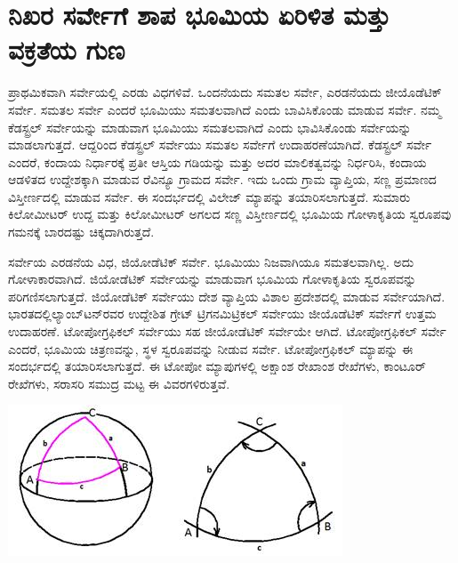 
\chapter{ನಿಖರ ಸರ್ವೇಗೆ ಶಾಪ ಭೂಮಿಯ ಏರಿಳಿತ ಮತ್ತು ವಕ್ರತೆಯ ಗುಣ}

ಪ್ರಾಥಮಿಕವಾಗಿ ಸರ್ವೇಯಲ್ಲಿ ಎರಡು ವಿಧಗಳಿವೆ. ಒಂದನೆಯದು ಸಮತಲ ಸರ್ವೇ, ಎರಡನೆಯದು ಜೀಯೊಡೆಟಿಕ್​ ಸರ್ವೇ. ಸಮತಲ ಸರ್ವೇ ಎಂದರೆ ಭೂಮಿಯು ಸಮತಲವಾಗಿದೆ ಎಂದು ಬಾವಿಸಿಕೊಂಡು ಮಾಡುವ ಸರ್ವೇ. ನಮ್ಮ ಕೆಡಸ್ಟ್ರಲ್​ ಸರ್ವೇಯನ್ನು ಮಾಡುವಾಗ ಭೂಮಿಯು ಸಮತಲವಾಗಿದೆ ಎಂದು ಭಾವಿಸಿಕೊಂಡು ಸರ್ವೇಯನ್ನು ಮಾಡಲಾಗುತ್ತದೆ. ಆದ್ದರಿಂದ ಕೆಡಸ್ಟ್ರಲ್​ ಸರ್ವೇಯು ಸಮತಲ ಸರ್ವೇಗೆ ಉದಾಹರಣೆಯಾಗಿದೆ. ಕೆಡಸ್ಟ್ರಲ್​ ಸರ್ವೇ ಎಂದರೆ, ಕಂದಾಯ ನಿರ್ಧಾರಕ್ಕೆ ಪ್ರತೀ ಆಸ್ತಿಯ ಗಡಿಯನ್ನು ಮತ್ತು ಅದರ ಮಾಲಿಕತ್ವವನ್ನು ನಿರ್ಧರಿಸಿ, ಕಂದಾಯ ಆಡಳಿತದ ಉದ್ದೇಶಕ್ಕಾಗಿ ಮಾಡುವ ರೆವಿನ್ಯೂ ಗ್ರಾಮದ ಸರ್ವೇ. ಇದು ಒಂದು ಗ್ರಾಮ ವ್ಯಾಪ್ತಿಯ, ಸಣ್ಣ ಪ್ರಮಾಣದ ವಿಸ್ತೀರ್ಣದಲ್ಲಿ ಮಾಡುವ ಸರ್ವೇ. ಈ ಸಂದರ್ಭದಲ್ಲಿ ವಿಲೇಜ್​ ಮ್ಯಾಪನ್ನು ತಯಾರಿಸಲಾಗುತ್ತದೆ. ಸುಮಾರು  ಕಿಲೋಮೀಟರ್​ ಉದ್ದ ಮತ್ತು  ಕಿಲೋಮೀಟರ್​ ಅಗಲದ ಸಣ್ಣ ವಿಸ್ತೀರ್ಣದಲ್ಲಿ ಭೂಮಿಯ ಗೋಳಾಕೃತಿಯ ಸ್ವರೂಪವು ಗಮನಕ್ಕೆ ಬಾರದಷ್ಟು ಚಿಕ್ಕದಾಗಿರುತ್ತದೆ.

ಸರ್ವೇಯ ಎರಡನೆಯ ವಿಧ, ಜಿಯೋಡೆಟಿಕ್​ ಸರ್ವೇ. ಭೂಮಿಯು ನಿಜವಾಗಿಯೂ ಸಮತಲವಾಗಿಲ್ಲ. ಅದು ಗೋಳಾಕಾರವಾಗಿದೆ. ಜಿಯೋಡೆಟಿಕ್​ ಸರ್ವೇಯನ್ನು ಮಾಡುವಾಗ ಭೂಮಿಯ ಗೋಳಾಕೃತಿಯ ಸ್ವರೂಪವನ್ನು ಪರಿಗಣಿಸಲಾಗುತ್ತದೆ. ಜಿಯೋಡೆಟಿಕ್​ ಸರ್ವೇಯು ದೇಶ ವ್ಯಾಪ್ತಿಯ ವಿಶಾಲ ಪ್ರದೇಶದಲ್ಲಿ ಮಾಡುವ ಸರ್ವೇಯಾಗಿದೆ. ಭಾರತದಲ್ಲಿ\break ಲ್ಯಾಂಬ್​ಟನ್​ರವರ ಉದ್ದೇಶಿತ ಗ್ರೇಟ್​ ಟ್ರಿಗನಮಿಟ್ರಿಕಲ್​ ಸರ್ವೇಯು ಜೀಯೊಡೆಟಿಕ್​ ಸರ್ವೇಗೆ ಉತ್ತಮ ಉದಾಹರಣೆ. ಟೋಪೋಗ್ರಫಿಕಲ್​ ಸರ್ವೇಯು ಸಹ ಜೀಯೋಡೆಟಿಕ್​ ಸರ್ವೇಯೇ ಆಗಿದೆ. ಟೋಪೋಗ್ರಫಿಕಲ್​ ಸರ್ವೇ ಎಂದರೆ, ಭೂಮಿಯ ಚಿತ್ರಣವನ್ನು, ಸ್ಥಳ ಸ್ವರೂಪವನ್ನು ನೀಡುವ ಸರ್ವೇ. ಟೋಪೋಗ್ರಫಿಕಲ್​ ಮ್ಯಾಪನ್ನು ಈ ಸಂದರ್ಭದಲ್ಲಿ ತಯಾರಿಸಲಾಗುತ್ತದೆ. ಈ ಟೋಪೋ ಮ್ಯಾಪುಗಳಲ್ಲಿ ಅಕ್ಷಾಂಶ ರೇಖಾಂಶ ರೇಖೆಗಳು, ಕಾಂಟೂರ್​ ರೇಖೆಗಳು, ಸರಾಸರಿ ಸಮುದ್ರ ಮಟ್ಟ ಈ ವಿವರಗಳಿರುತ್ತವೆ.

\begin{center}
\includegraphics[scale=0.55]{"images/image001.jpg"}
\end{center}

